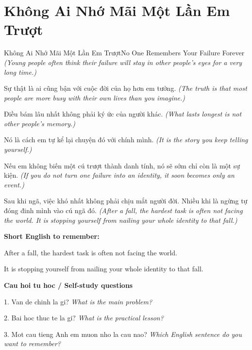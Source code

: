 \section{Không Ai Nhớ Mãi Một Lần Em Trượt}
\begin{truyen}{Không Ai Nhớ Mãi Một Lần Em Trượt}{No One Remembers Your Failure Forever}
\textit{(Young people often think their failure will stay in other people’s eyes for a very long time.)}

Sự thật là ai cũng bận với cuộc đời của họ hơn em tưởng.
\textit{(The truth is that most people are more busy with their own lives than you imagine.)}

Điều bám lâu nhất không phải ký ức của người khác.
\textit{(What lasts longest is not other people’s memory.)}

Nó là cách em tự kể lại chuyện đó với chính mình.
\textit{(It is the story you keep telling yourself.)}

Nếu em không biến một cú trượt thành danh tính, nó sẽ sớm chỉ còn là một sự kiện.
\textit{(If you do not turn one failure into an identity, it soon becomes only an event.)}

\end{truyen}

\begin{baihoc}
Sau khi ngã, việc khó nhất không phải chịu mắt người đời. Nhiều khi là ngừng tự đóng đinh mình vào cú ngã đó.
\textit{(After a fall, the hardest task is often not facing the world. It is stopping yourself from nailing your whole identity to that fall.)}
\end{baihoc}

\begin{ghinhoanh}
\textbf{Short English to remember:}

After a fall, the hardest task is often not facing the world.

It is stopping yourself from nailing your whole identity to that fall.

\end{ghinhoanh}

\begin{tuhocnhanh}
\textbf{Cau hoi tu hoc / Self-study questions}

1. Van de chinh la gi? \textit{What is the main problem?}

2. Bai hoc thuc te la gi? \textit{What is the practical lesson?}

3. Mot cau tieng Anh em muon nho la cau nao? \textit{Which English sentence do you want to remember?}
\end{tuhocnhanh}
\ngancach

